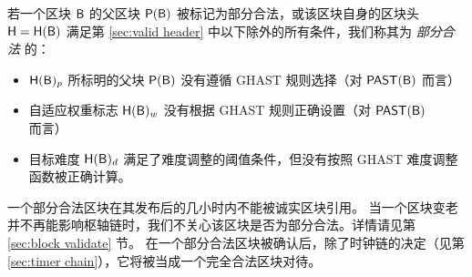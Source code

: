 若一个区块 $\textsf{B}$ 的父区块 $\mathsf{P}{\left({\textsf{B}} \right)}$ 被标记为部分合法，或该区块自身的区块头 $\textsf{H}=\textsf{H}(\textsf{B})$ 满足第 \ref{sec:valid header} 中以下除外的所有条件，我们称其为 \emph{部分合法} 的：
\begin{itemize}


	
	\item $\textsf{H}(\textsf{B})_{p}$ 所标明的父块 $\mathsf{P}{\left({\textsf{B}} \right)}$ 没有遵循 GHAST 规则选择（对 $\mathsf{PAST}(\textsf{B})$ 而言）

	\item 自适应权重标志 $\textsf{H}(\textsf{B})_{w}$ 没有根据 GHAST 规则正确设置（对 $\mathsf{PAST}(\textsf{B})$ 而言）

	\item 目标难度 $\textsf{H}(\textsf{B})_{d}$ 满足了难度调整的阈值条件，但没有按照 GHAST 难度调整函数被正确计算。
\end{itemize}


一个部分合法区块在其发布后的几小时内不能被诚实区块引用。
当一个区块变老并不再能影响枢轴链时，我们不关心该区块是否为部分合法。详情请见第 \ref{sec:block validate} 节。 
在一个部分合法区块被确认后，除了时钟链的决定（见第 \ref{sec:timer chain}），它将被当成一个完全合法区块对待。


